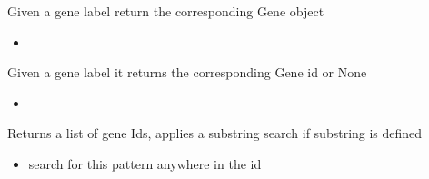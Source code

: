 \documentclass[letterpaper,10pt,english]{sphinxmanual}
\begin{document}
\begin{fulllineitems}
\begin{fulllineitems}
\begin{itemize}
\end{itemize}

\end{fulllineitems}


\begin{fulllineitems}
\label{\detokenize{modules_doc:cbmpy.CBModel.Model.getGeneByLabel}}
\pysigstartsignatures
{}
\pysigstopsignatures
\sphinxAtStartPar
Given a gene label return the corresponding Gene object
\begin{itemize}
\item {} 
\sphinxAtStartPar
{}

\end{itemize}

\end{fulllineitems}


\begin{fulllineitems}
\label{\detokenize{modules_doc:cbmpy.CBModel.Model.getGeneIdFromLabel}}
\pysigstartsignatures
{}
\pysigstopsignatures
\sphinxAtStartPar
Given a gene label it returns the corresponding Gene id or None
\begin{itemize}
\item {} 
\sphinxAtStartPar
{}

\end{itemize}

\end{fulllineitems}


\begin{fulllineitems}
\label{\detokenize{modules_doc:cbmpy.CBModel.Model.getGeneIds}}
\pysigstartsignatures
{}
\pysigstopsignatures
\sphinxAtStartPar
Returns a list of gene Ids, applies a substring search if substring is defined
\begin{itemize}
\item {} 
\sphinxAtStartPar
{} search for this pattern anywhere in the id


\end{itemize}
\end{fulllineitems}
\end{fulllineitems}
\end{document}
